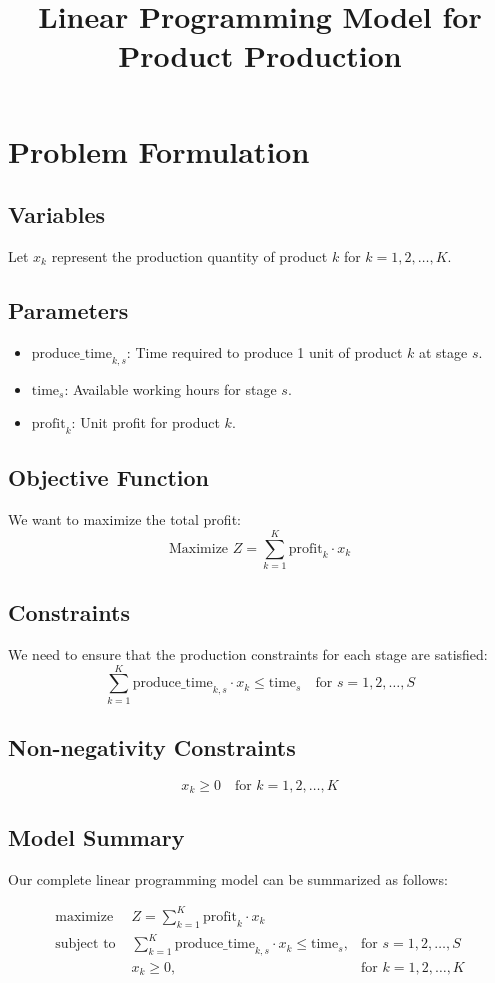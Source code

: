 \documentclass{article}
\begin{document}
\title{Linear Programming Model for Product Production}
\author{}
\date{}
\maketitle

\section*{Problem Formulation}

\subsection*{Variables}
Let \( x_k \) represent the production quantity of product \( k \) for \( k = 1, 2, \ldots, K \).

\subsection*{Parameters}
\begin{itemize}
    \item \( \text{produce\_time}_{k, s} \): Time required to produce 1 unit of product \( k \) at stage \( s \).
    \item \( \text{time}_s \): Available working hours for stage \( s \).
    \item \( \text{profit}_k \): Unit profit for product \( k \).
\end{itemize}

\subsection*{Objective Function}
We want to maximize the total profit:
\[
\text{Maximize } Z = \sum_{k=1}^{K} \text{profit}_k \cdot x_k
\]

\subsection*{Constraints}
We need to ensure that the production constraints for each stage are satisfied:
\[
\sum_{k=1}^{K} \text{produce\_time}_{k, s} \cdot x_k \leq \text{time}_s \quad \text{for } s = 1, 2, \ldots, S
\]

\subsection*{Non-negativity Constraints}
\[
x_k \geq 0 \quad \text{for } k = 1, 2, \ldots, K
\]

\subsection*{Model Summary}
Our complete linear programming model can be summarized as follows:

\begin{align*}
\text{maximize } & Z = \sum_{k=1}^{K} \text{profit}_k \cdot x_k \\
\text{subject to } & \sum_{k=1}^{K} \text{produce\_time}_{k, s} \cdot x_k \leq \text{time}_s, & \text{for } s = 1, 2, \ldots, S \\
& x_k \geq 0, & \text{for } k = 1, 2, \ldots, K
\end{align*}
\end{document}
